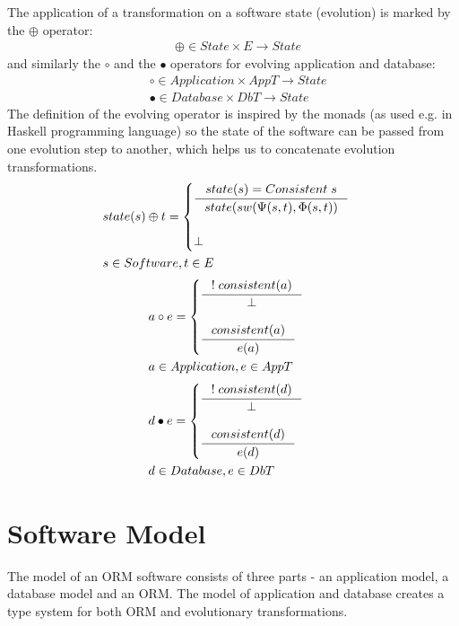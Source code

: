 \documentclass[11pt]{article}
\begin{document}
The application of a transformation on a software state (evolution) is marked by the $\oplus$ operator:
\begin{align*}
& \oplus \in State \times E \rightarrow State
\end{align*}
and similarly the $\circ$ and the $\bullet$ operators for evolving application and database:
\begin{align*}
& \circ \in Application \times AppT \rightarrow State \\
& \bullet \in Database \times DbT \rightarrow State
\end{align*}
The definition of the evolving operator is inspired by the monads (as used e.g. in Haskell programming language) so the state of the software can be passed from one evolution step to another, which helps us to concatenate evolution transformations.
\begin{align*}
& state(s) \oplus t = \begin{cases}
 	\inference{state(s) = Consistent \; s}{state(sw(\Psi(s, t), \Phi(s,t))} \\ \\
 	\perp
\end{cases}\\ 
& s \in Software, t \in E
\end{align*}
\begin{align*}
& a \circ e = \begin{cases}
 	\inference{!\;consistent(a)}{\perp} \\ \\
 	\inference{consistent(a)}{e(a)} 
\end{cases}\\ 
& a \in Application, e \in AppT
\end{align*}
\begin{align*}
&  d \bullet e = \begin{cases}
 	\inference{!\;consistent(d)}{\perp} \\ \\
 	\inference{consistent(d)}{e(d)} 
\end{cases}\\ 
& d \in Database, e \in DbT
\end{align*}

\section{Software Model}
The model of an ORM software consists of three parts - an application model, a database model and an ORM. The model of application and database creates a type system for both ORM and evolutionary transformations.
\end{document}
